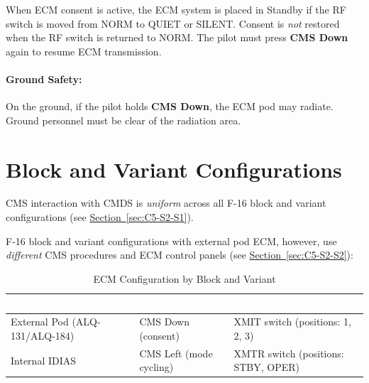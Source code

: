\documentclass[11pt, a4paper, twoside]{report}
\newcommand{\secref}[1]{\hyperref[#1]{Section~\ref*{#1}}}
\begin{document}
When ECM consent is active, the ECM system is placed in Standby if the RF switch is moved from NORM to QUIET or SILENT. Consent is \textit{not} restored when the RF switch is returned to NORM. The pilot must press \textbf{CMS Down} again to resume ECM transmission.

\paragraph{Ground Safety:}

On the ground, if the pilot holds \textbf{CMS Down}, the ECM pod may radiate. Ground personnel must be clear of the radiation area.

\section{Block and Variant Configurations}
\label{sec:C5-S3}

CMS interaction with CMDS is \textit{uniform} across all F-16 block and variant configurations (see \secref{sec:C5-S2-S1}).

F-16 block and variant configurations with external pod ECM, however, use \textit{different} CMS procedures and ECM control panels (see \secref{sec:C5-S2-S2}):

\begin{table}[H]
\centering
\caption{ECM Configuration by Block and Variant}
\label{tab:C5-S3-ecm-config-summary}
\small
\renewcommand{\arraystretch}{1.25}
\begin{tabular}{|>{\raggedright\arraybackslash}p{3.6cm}|>{\raggedright\arraybackslash}p{3.6cm}|>{\raggedright\arraybackslash}p{4.6cm}|}
\hline
\rowcolor{headerblue}
\textcolor{white}{\textbf{ECM Configuration}} & \textcolor{white}{\textbf{CMS Direction}} & \textcolor{white}{\textbf{Panel Control}} \\
\hline
External Pod (ALQ-131/ALQ-184) & CMS Down (consent) & XMIT switch (positions: 1, 2, 3) \\
\hline
Internal IDIAS & CMS Left (mode cycling) & XMTR switch (positions: STBY, OPER) \\
\hline
\end{tabular}
\end{table}

\end{document}
